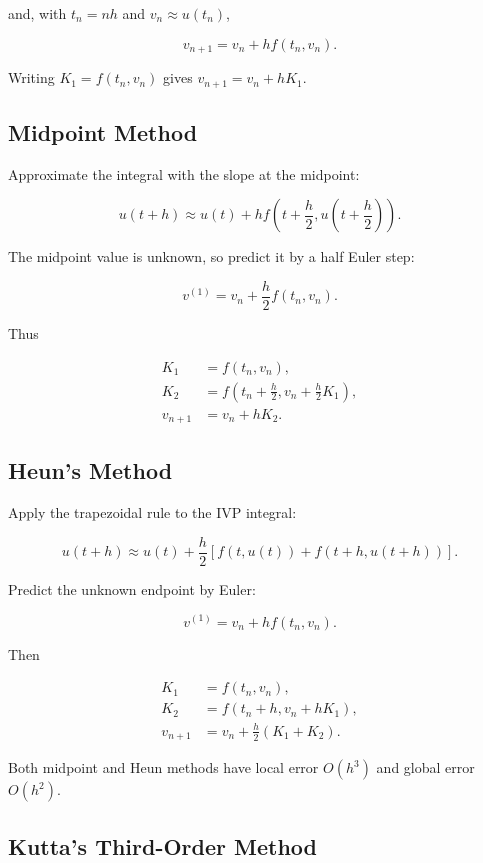 \documentclass[12pt, a4paper]{article}
\theoremstyle{break}
\begin{document}
and, with \(t_n=nh\) and \(v_n\approx u(t_n)\),

\[
\boxed{v_{n+1}=v_n+hf(t_n,v_n)}.
\]

Writing \(K_1=f(t_n,v_n)\) gives \(v_{n+1}=v_n+hK_1\).

\subsection{Midpoint Method}\label{midpoint-method}

Approximate the integral with the slope at the midpoint:

\[
u(t+h)\approx u(t)+hf\left(t+\frac h2,u\left(t+\frac h2\right)\right).
\]

The midpoint value is unknown, so predict it by a half Euler step:

\[
v^{(1)}=v_n+\frac h2f(t_n,v_n).
\]

Thus

\[
\begin{aligned}
K_1&=f(t_n,v_n),\\
K_2&=f\left(t_n+\frac h2,v_n+\frac h2K_1\right),\\
v_{n+1}&=v_n+hK_2.
\end{aligned}
\]

\subsection{Heun's Method}\label{heuns-method}

Apply the trapezoidal rule to the IVP integral:

\[
u(t+h)\approx u(t)+\frac h2[f(t,u(t))+f(t+h,u(t+h))].
\]

Predict the unknown endpoint by Euler:

\[
v^{(1)}=v_n+hf(t_n,v_n).
\]

Then

\[
\begin{aligned}
K_1&=f(t_n,v_n),\\
K_2&=f(t_n+h,v_n+hK_1),\\
v_{n+1}&=v_n+\frac h2(K_1+K_2).
\end{aligned}
\]

Both midpoint and Heun methods have local error \(O(h^3)\) and global error \(O(h^2)\).

\subsection{Kutta's Third-Order Method}\label{kuttas-third-order-method}
\end{document}

